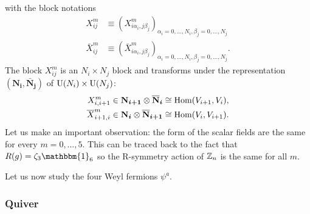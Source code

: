            with the block notations
            \begin{align*}
                X^m_{ij}&\equiv (X^m_{i\alpha_i,j\beta_j})_{\alpha_i=0,\dots,N_i,\beta_j=0,\dots,N_j}\\
                \bar{X}^m_{ij}&\equiv (\bar{X}^m_{i\alpha_i,j\beta_j})_{\alpha_i=0,\dots,N_i,\beta_j=0,\dots,N_j}.
            \end{align*}
            The block $X^m_{ij}$ is an $N_i\times N_j$ block and transforms under the representation $(\boldsymbol{\textbf{N}_i},\boldsymbol{\bar{\textbf{N}}_j})$ of $\text{U}(N_i)\times\text{U}(N_j)$:
            \begin{align}
                X^m_{i,i+1} &\in \boldsymbol{\textbf{N}_{i+1}}\otimes\boldsymbol{\overline{\textbf{N}}_i} \cong \text{Hom}(V_{i+1},V_i),\\
                \overline{X}^m_{i+1,i} &\in \boldsymbol{\textbf{N}_{i}}\otimes\boldsymbol{\overline{\textbf{N}}_{i+1}} \cong \text{Hom}(V_{i},V_{i+1}).
            \end{align}
            Let us make an important observation: the form of the scalar fields are the same for every $m=0,\dots,5$. This can be traced back to the fact that $R(g)=\zeta_3\mathbbm{1}_6$ so the R-symmetry action of $\mathbb{Z}_n$ is the same for all $m$.

            Let us now study the four Weyl fermions $\psi^a$.\marker

        \subsubsection{Quiver}

